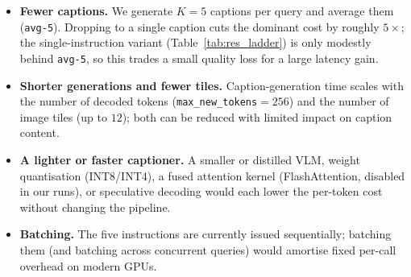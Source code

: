 \begin{itemize}
  \item \textbf{Fewer captions.} We generate $K{=}5$ captions per query and
    average them (\texttt{avg-5}). Dropping to a single caption cuts the dominant
    cost by roughly $5\times$; the single-instruction variant
    (Table~\ref{tab:res_ladder}) is only modestly behind \texttt{avg-5}, so this
    trades a small quality loss for a large latency gain.
  \item \textbf{Shorter generations and fewer tiles.} Caption-generation time
    scales with the number of decoded tokens (\texttt{max\_new\_tokens}$=256$)
    and the number of image tiles (up to $12$); both can be reduced with limited
    impact on caption content.
  \item \textbf{A lighter or faster captioner.} A smaller or distilled VLM,
    weight quantisation (INT8/INT4), a fused attention kernel (FlashAttention,
    disabled in our runs), or speculative decoding would each lower the
    per-token cost without changing the pipeline.
  \item \textbf{Batching.} The five instructions are currently issued
    sequentially; batching them (and batching across concurrent queries) would
    amortise fixed per-call overhead on modern GPUs.
\end{itemize}
